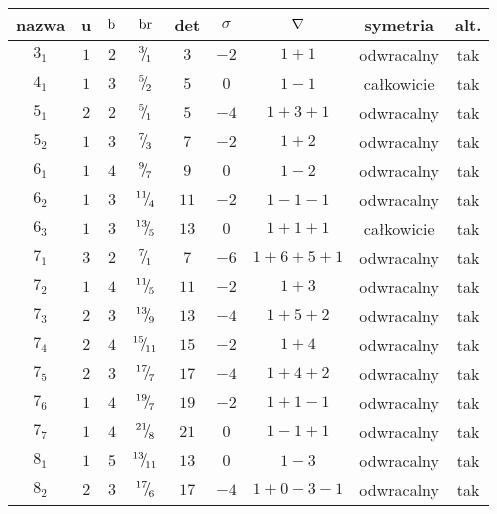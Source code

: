 
\renewcommand*{\arraystretch}{1.4}
\footnotesize
\begin{longtable}{ccccccccc}
\hline
nazwa & u & $\operatorname{b}$ & $\operatorname{br}$ & det & $\sigma$ & $\nabla$ & symetria & alt. \\ \hline
\endhead %
$3_{1}$ & $1$ & $2$ & ${}^{3}{\mskip -5mu/\mskip -3mu}_{1}$ & $3$ & $-2$ & $1+1$ & odwracalny & tak \\
$4_{1}$ & $1$ & $3$ & ${}^{5}{\mskip -5mu/\mskip -3mu}_{2}$ & $5$ & $0$ & $1-1$ & całkowicie & tak \\
$5_{1}$ & $2$ & $2$ & ${}^{5}{\mskip -5mu/\mskip -3mu}_{1}$ & $5$ & $-4$ & $1+3+1$ & odwracalny & tak \\
$5_{2}$ & $1$ & $3$ & ${}^{7}{\mskip -5mu/\mskip -3mu}_{3}$ & $7$ & $-2$ & $1+2$ & odwracalny & tak \\
$6_{1}$ & $1$ & $4$ & ${}^{9}{\mskip -5mu/\mskip -3mu}_{7}$ & $9$ & $0$ & $1-2$ & odwracalny & tak \\
$6_{2}$ & $1$ & $3$ & ${}^{11}{\mskip -5mu/\mskip -3mu}_{4}$ & $11$ & $-2$ & $1-1-1$ & odwracalny & tak \\
$6_{3}$ & $1$ & $3$ & ${}^{13}{\mskip -5mu/\mskip -3mu}_{5}$ & $13$ & $0$ & $1+1+1$ & całkowicie & tak \\
$7_{1}$ & $3$ & $2$ & ${}^{7}{\mskip -5mu/\mskip -3mu}_{1}$ & $7$ & $-6$ & $1+6+5+1$ & odwracalny & tak \\
$7_{2}$ & $1$ & $4$ & ${}^{11}{\mskip -5mu/\mskip -3mu}_{5}$ & $11$ & $-2$ & $1+3$ & odwracalny & tak \\
$7_{3}$ & $2$ & $3$ & ${}^{13}{\mskip -5mu/\mskip -3mu}_{9}$ & $13$ & $-4$ & $1+5+2$ & odwracalny & tak \\
$7_{4}$ & $2$ & $4$ & ${}^{15}{\mskip -5mu/\mskip -3mu}_{11}$ & $15$ & $-2$ & $1+4$ & odwracalny & tak \\
$7_{5}$ & $2$ & $3$ & ${}^{17}{\mskip -5mu/\mskip -3mu}_{7}$ & $17$ & $-4$ & $1+4+2$ & odwracalny & tak \\
$7_{6}$ & $1$ & $4$ & ${}^{19}{\mskip -5mu/\mskip -3mu}_{7}$ & $19$ & $-2$ & $1+1-1$ & odwracalny & tak \\
$7_{7}$ & $1$ & $4$ & ${}^{21}{\mskip -5mu/\mskip -3mu}_{8}$ & $21$ & $0$ & $1-1+1$ & odwracalny & tak \\
$8_{1}$ & $1$ & $5$ & ${}^{13}{\mskip -5mu/\mskip -3mu}_{11}$ & $13$ & $0$ & $1-3$ & odwracalny & tak \\
$8_{2}$ & $2$ & $3$ & ${}^{17}{\mskip -5mu/\mskip -3mu}_{6}$ & $17$ & $-4$ & $1+0-3-1$ & odwracalny & tak \\

\end{longtable}
